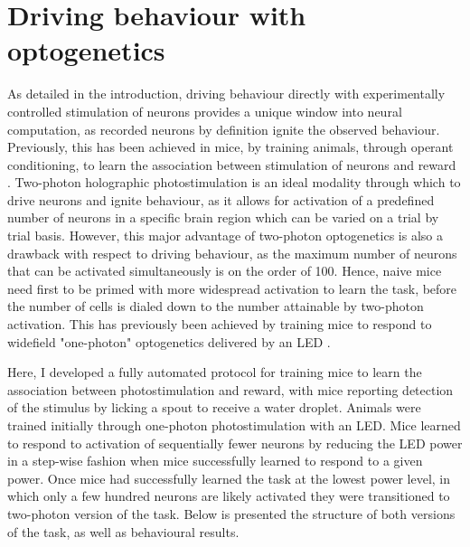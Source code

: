 \chapter{\label{behaviour} Driving behaviour with optogenetics}

\minitoc



As detailed in the introduction, driving behaviour directly with experimentally controlled stimulation of neurons provides a unique window into neural computation, as recorded neurons by definition ignite the observed behaviour. Previously, this has been achieved in mice, by training animals, through operant conditioning, to learn the association between stimulation of neurons and reward \cite{huber_sparse_2008, houweling_behavioural_2008, histed_cortical_2014, dalgleish_how_2020, gill_precise_2020}. Two-photon holographic photostimulation is an ideal modality through which to drive neurons and ignite behaviour, as it allows for activation of a predefined number of neurons in a specific brain region which can be varied on a trial by trial basis. However, this major advantage of two-photon optogenetics is also a drawback with respect to driving behaviour, as the maximum number of neurons that can be activated simultaneously is on the order of 100. Hence, naive mice need first to be primed with more widespread activation to learn the task, before the number of cells is dialed down to the number attainable by two-photon activation. This has previously been achieved by training mice to respond to widefield "one-photon" optogenetics delivered by an LED \cite{dalgleish_how_2020, gill_precise_2020}.

Here, I developed a fully automated protocol for training mice to learn the association between photostimulation and reward, with mice reporting detection of the stimulus by licking a spout to receive a water droplet. Animals were trained initially through one-photon photostimulation with an LED. Mice learned to respond to activation of sequentially fewer neurons by reducing the LED power in a step-wise fashion when mice successfully learned to respond to a given power. Once mice had successfully learned the task at the lowest power level, in which only a few hundred neurons are likely activated \cite{huber_sparse_2008} they were transitioned to two-photon version of the task. Below is presented the structure of both versions of the task, as well as behavioural results. 


